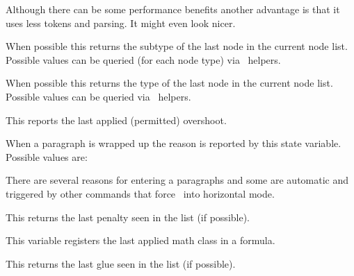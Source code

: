 Although there can be some performance benefits another advantage is that it uses
less tokens and parsing. It might even look nicer.

\stopnewprimitive

\startnewprimitive[title={\prm {lastnodesubtype}}]

When possible this returns the subtype of the last node in the current node list.
Possible values can be queried (for each node type) via \LUA\ helpers.

\stopnewprimitive

\startoldprimitive[title={\prm {lastnodetype}}]

When possible this returns the type of the last node in the current node list.
Possible values can be queried via \LUA\ helpers.

\stopoldprimitive

\startnewprimitive[title={\prm {lastpageextra}}]

This reports the last applied (permitted) overshoot.

\stopnewprimitive

\startnewprimitive[title={\prm {lastparcontext}}]

When a paragraph is wrapped up the reason is reported by this state variable.
Possible values are:

\startfourrows
{}
\stopfourrows

\stopnewprimitive

\startnewprimitive[title={\prm {lastpartrigger}}]

There are several reasons for entering a paragraphs and some are automatic and
triggered by other commands that force \TEX\ into horizontal mode.

\startfourrows
{}
\stopfourrows

\stopnewprimitive

\startoldprimitive[title={\prm {lastpenalty}}]

This returns the last penalty seen in the list (if possible).

\stopoldprimitive

\startnewprimitive[title={\prm {lastrightclass}}]

This variable registers the last applied math class in a formula.

\stopnewprimitive

\startoldprimitive[title={\prm {lastskip}}]

This returns the last glue seen in the list (if possible).

